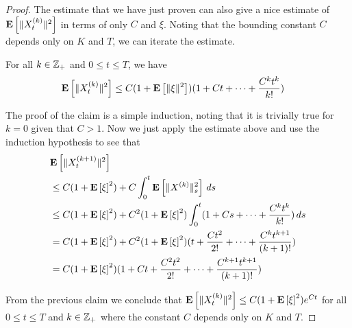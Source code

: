 \begin{proof}
The estimate that we have just proven can also give a nice estimate of $\textbf{E}\left[\lVert X^{(k)}_t \rVert^2\right] $ in terms of only $C$ and $\xi$.  Noting that the 
bounding constant $C$ depends only on $K$ and $T$, we can iterate the estimate.
\begin{clm}For all $k \in \mathbb{Z}_+$ and $0 \leq t\leq T$, we have 
\begin{align*}
\textbf{E}\left[\lVert X^{(k)}_t \rVert^2\right] &\leq C(1 + \textbf{E}\left[\lVert \xi \rVert^2\right])(1 + Ct + \dotsm + \frac{C^kt^k}{k!})
\end{align*}
\end{clm}
The proof of the claim is a simple induction, noting that it is trivially true for $k=0$ given that $C > 1$.  Now we just apply the estimate above and use the induction 
hypothesis to see that
\begin{align*}
&\textbf{E}\left[\lVert X^{(k+1)}_t \rVert^2\right]  \\
&\leq C(1 + \textbf{E}\left[\xi\right]^2) + C \int_0^t \textbf{E}\left[\lVert X^{(k)} \rVert_s^2 \right] \, ds \\
&\leq C(1 + \textbf{E}\left[\xi\right]^2) + C^2 (1 + \textbf{E}\left[\xi\right]^2) \int_0^t (1 + C s + \dotsm + \frac{C^k t^k}{k!}) \, ds \\
&= C(1 + \textbf{E}\left[\xi\right]^2) + C^2 (1 + \textbf{E}\left[\xi\right]^2) (t + \frac{C t^2}{2!} + \dotsm + \frac{C^k t^{k+1}}{(k+1)!}) \\
&= C(1 + \textbf{E}\left[\xi\right]^2) (1 + Ct + \frac{C^2 t^2}{2!} + \dotsm + \frac{C^{k+1} t^{k+1}}{(k+1)!}) \\
\end{align*}

From the previous claim we conclude that $\textbf{E}\left[\lVert X^{(k)}_t \rVert^2\right]  \leq C(1 + \textbf{E}\left[\xi\right]^2) e^{Ct}$ for all $0 \leq t \leq T$ and $k \in \mathbb{Z}_+$ where the
constant $C$ depends only on $K$ and $T$.  


\end{proof}
